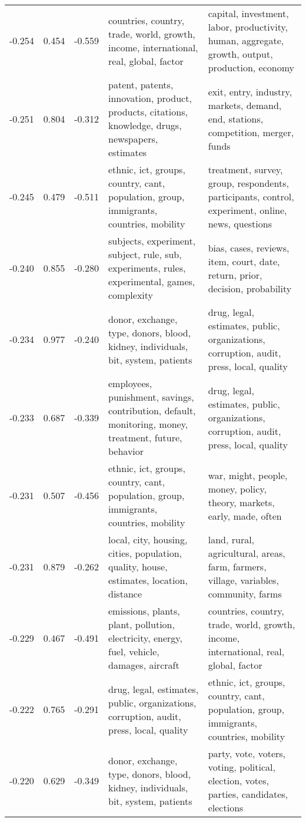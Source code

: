 \begin{tabular}{cccp{5cm}p{5cm}}
-0.254 & 0.454 & -0.559 & countries, country, trade, world, growth, income, international, real, global, factor & capital, investment, labor, productivity, human, aggregate, growth, output, production, economy \\
-0.251 & 0.804 & -0.312 & patent, patents, innovation, product, products, citations, knowledge, drugs, newspapers, estimates & exit, entry, industry, markets, demand, end, stations, competition, merger, funds \\
-0.245 & 0.479 & -0.511 & ethnic, ict, groups, country, cant, population, group, immigrants, countries, mobility & treatment, survey, group, respondents, participants, control, experiment, online, news, questions \\
-0.240 & 0.855 & -0.280 & subjects, experiment, subject, rule, sub, experiments, rules, experimental, games, complexity & bias, cases, reviews, item, court, date, return, prior, decision, probability \\
-0.234 & 0.977 & -0.240 & donor, exchange, type, donors, blood, kidney, individuals, bit, system, patients & drug, legal, estimates, public, organizations, corruption, audit, press, local, quality \\
-0.233 & 0.687 & -0.339 & employees, punishment, savings, contribution, default, monitoring, money, treatment, future, behavior & drug, legal, estimates, public, organizations, corruption, audit, press, local, quality \\
-0.231 & 0.507 & -0.456 & ethnic, ict, groups, country, cant, population, group, immigrants, countries, mobility & war, might, people, money, policy, theory, markets, early, made, often \\
-0.231 & 0.879 & -0.262 & local, city, housing, cities, population, quality, house, estimates, location, distance & land, rural, agricultural, areas, farm, farmers, village, variables, community, farms \\
-0.229 & 0.467 & -0.491 & emissions, plants, plant, pollution, electricity, energy, fuel, vehicle, damages, aircraft & countries, country, trade, world, growth, income, international, real, global, factor \\
-0.222 & 0.765 & -0.291 & drug, legal, estimates, public, organizations, corruption, audit, press, local, quality & ethnic, ict, groups, country, cant, population, group, immigrants, countries, mobility \\
-0.220 & 0.629 & -0.349 & donor, exchange, type, donors, blood, kidney, individuals, bit, system, patients & party, vote, voters, voting, political, election, votes, parties, candidates, elections \\

\end{tabular}

